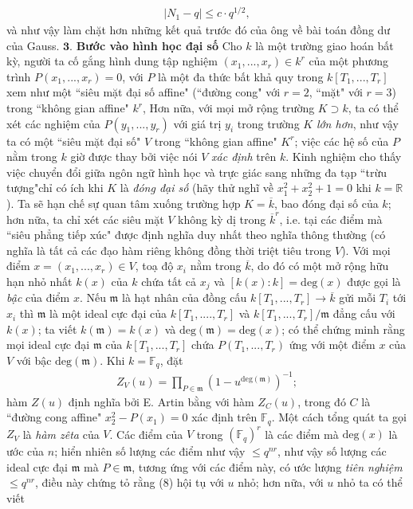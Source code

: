\begin{multicols}{2}
	\begin{align*}  
		\left|N_1 -q \right| \leq  c \cdot q^{1/2}, \tag{$7$}
	\end{align*}
	và như vậy làm chặt hơn những kết quả trước đó của ông về bài toán đồng dư của Gauss. 
	\vskip 0.1cm
	$\pmb{3.}$ \textbf{\color{duongvaotoanhoc}Bước vào hình học đại số}
	\vskip 0.1cm
	Cho $k$ là một trường giao hoán bất kỳ, người ta cố gắng hình dung tập nghiệm $(x_1,...,x_r) \in k^r$ của một phương trình $P(x_1,...,x_r)=0$, với $P$ là một đa thức bất khả quy trong $k[T_1,...,T_r]$ xem như một ``siêu mặt đại số affine" (``đường cong" với $r=2$, ``mặt" với $r=3$) trong ``không gian affine" $k^r$, Hơn nữa, với mọi mở rộng trường $K \supset k$, ta có thể xét các nghiệm của $P(y_1,...,y_r)$ với giá trị $y_i$ trong trường $K$ \textit{lớn hơn}, như vậy ta có một ``siêu mặt đại số" $V$ trong ``không gian affine" $K^r$; việc các hệ số của $P$ nằm trong $k$ giờ được thay bởi việc nói $V$ \textit{xác định} trên $k$. Kinh nghiệm cho thấy việc chuyển đổi giữa ngôn ngữ hình học và trực giác sang những đa tạp ``trừu tượng"chỉ có ích khi $K$ là \textit{đóng đại số} (hãy thử nghĩ về $x_1^2+x_2^2+1=0$ khi $k=\mathbb{R}$). Ta sẽ hạn chế sự quan tâm xuống trường hợp $K=\overline{k}$, bao đóng đại số của $k$; hơn nữa, ta chỉ xét các siêu mặt $V$ không kỳ dị trong $\overline{k}^r$, i.e. tại các điểm mà ``siêu phẳng tiếp xúc" được định nghĩa duy nhất theo nghĩa thông thường (có nghĩa là tất cả các đạo hàm riêng không đồng thời triệt tiêu trong $V$). Với mọi điểm $x=(x_1,...,x_r) \in V$, toạ độ $x_i$ nằm trong $\overline{k}$, do đó có một mở rộng hữu hạn nhỏ nhất $k(x)$ của $k$ chứa tất cả $x_j$ và $[k(x):k]=\mathrm{deg}(x)$ được gọi là \textit{bậc} của điểm $x$. Nếu $\mathfrak{m}$ là hạt nhân của đồng cấu $k[T_1,...,T_r] \to \overline{k}$ gửi mỗi $T_i$ tới $x_i$ thì $\mathfrak{m}$ là một ideal cực đại của $k[T_1,....,T_r]$ và $k[T_1,...,T_r]/\mathfrak{m}$ đẳng cấu với $k(x)$; ta viết $k(\mathfrak{m})=k(x)$ và $\mathrm{deg}(\mathfrak{m}) =\mathrm{deg}(x)$; có thể chứng minh rằng mọi ideal cực đại $\mathfrak{m}$ của $k[T_1,...,T_r]$ chứa $P(T_1,...,T_r)$ ứng với một điểm $x$ của $V$ với bậc $\mathrm{deg}(\mathfrak{m})$. 
	\vskip 0.1cm
	Khi $k=\mathbb{F}_q$, đặt
	\begin{align*}
		Z_V(u) = \prod_{P \in \mathfrak{m}}(1 - u^{\mathrm{deg}(\mathfrak{m})})^{-1}; \tag{$8$}
	\end{align*}
	hàm $Z(u)$ định nghĩa bởi E. Artin bằng với hàm $Z_C(u)$, trong đó $C$ là ``đường cong affine" $x_2^2 - P(x_1) = 0$ xác định trên $\mathbb{F}_q$. Một cách tổng quát ta gọi $Z_V$ là \textit{hàm zêta} của $V$. Các điểm của $V$ trong $(\mathbb{F}_q)^r$ là các điểm mà $\mathrm{deg}(x)$ là ước của $n$; hiển nhiên số lượng các điểm như vậy $\leq q^{nr}$, như vậy số lượng các ideal cực đại $\mathfrak{m}$ mà $P \in \mathfrak{m}$, tương ứng với các điểm này, có ước lượng \textit{tiên nghiệm} $\leq q^{nr}$, điều này chứng tỏ rằng ($8$) hội tụ với $u$ nhỏ; hơn nữa, với $u$ nhỏ ta có thể viết

\end{multicols}

